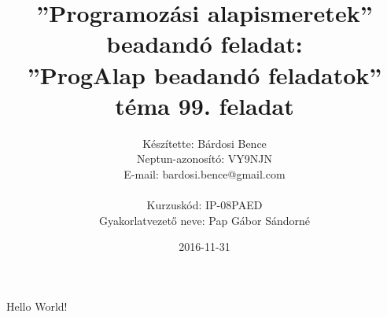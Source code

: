 \documentclass{article}
\title{”Programozási alapismeretek”\\ beadandó feladat:\\ ”ProgAlap beadandó feladatok” téma 99. feladat}
\date{2016-11-31}
\author{Készítette: Bárdosi Bence\\ Neptun-azonosító: VY9NJN\\ E-mail: bardosi.bence@gmail.com\\\\ Kurzuskód: IP-08PAED\\ Gyakorlatvezető neve: Pap Gábor Sándorné}
\begin{document}
  \maketitle
  \newpage
  Hello World!
\end{document}
